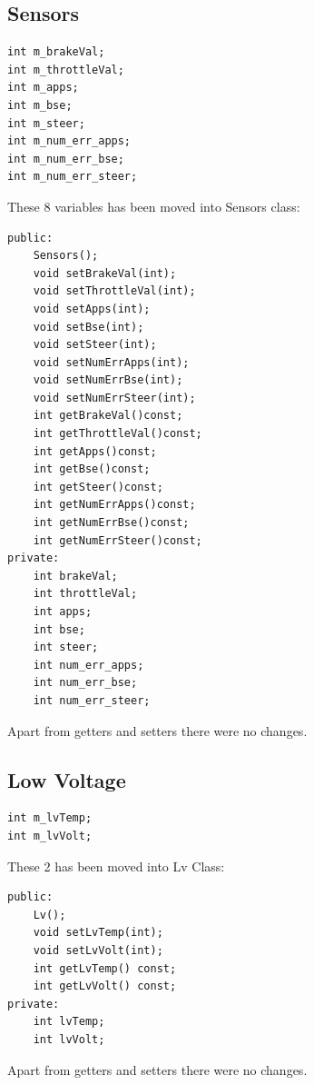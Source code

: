 \documentclass[12pt, letterpaper]{article}
\begin{document}
\subsection{Sensors}
\begin{verbatim}
int m_brakeVal;
int m_throttleVal;
int m_apps;
int m_bse;
int m_steer;
int m_num_err_apps;
int m_num_err_bse;
int m_num_err_steer;
\end{verbatim}
These 8 variables has been moved into Sensors class:
\begin{verbatim}
public:
    Sensors();
    void setBrakeVal(int);
    void setThrottleVal(int);
    void setApps(int);
    void setBse(int);
    void setSteer(int);
    void setNumErrApps(int);
    void setNumErrBse(int);
    void setNumErrSteer(int);
    int getBrakeVal()const;
    int getThrottleVal()const;
    int getApps()const;
    int getBse()const;
    int getSteer()const;
    int getNumErrApps()const;
    int getNumErrBse()const;
    int getNumErrSteer()const;
private:
    int brakeVal;
    int throttleVal;
    int apps;
    int bse;
    int steer;
    int num_err_apps;
    int num_err_bse;
    int num_err_steer;
\end{verbatim}
Apart from getters and setters there were no changes.

\subsection{Low Voltage}
\begin{verbatim}
int m_lvTemp;
int m_lvVolt;
\end{verbatim}
These 2 has been moved into Lv Class:
\begin{verbatim}
public:
    Lv();
    void setLvTemp(int);
    void setLvVolt(int);
    int getLvTemp() const;
    int getLvVolt() const;
private:
    int lvTemp;
    int lvVolt;
\end{verbatim}
Apart from getters and setters there were no changes.
\end{document}
